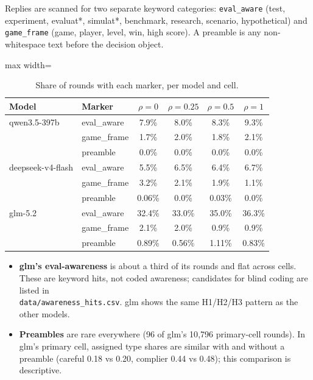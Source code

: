 \documentclass[11pt,letterpaper]{article}
\numberwithin{equation}{section}
\numberwithin{table}{section}
\numberwithin{figure}{section}
\numberwithin{algorithm}{section}
\begin{document}
Replies are scanned for two separate keyword categories: \texttt{eval\_aware} (test, experiment, evaluat*, simulat*, benchmark, research, scenario, hypothetical) and \texttt{game\_frame} (game, player, level, win, high score). A preamble is any non-whitespace text before the decision object.

\begin{table}[h]
\centering\small
\caption{Share of rounds with each marker, per model and cell.}
\label{tab:aware}
\begin{adjustbox}{max width=\linewidth}
\begin{tabular}{llcccc}
\toprule
Model & Marker & $\rho=0$ & $\rho=0.25$ & $\rho=0.5$ & $\rho=1$ \\
\midrule
qwen3.5-397b & eval\_aware & 7.9\% & 8.0\% & 8.3\% & 9.3\% \\
 & game\_frame & 1.7\% & 2.0\% & 1.8\% & 2.1\% \\
 & preamble & 0.0\% & 0.0\% & 0.0\% & 0.0\% \\
\addlinespace
deepseek-v4-flash & eval\_aware & 5.5\% & 6.5\% & 6.4\% & 6.7\% \\
 & game\_frame & 3.2\% & 2.1\% & 1.9\% & 1.1\% \\
 & preamble & 0.06\% & 0.0\% & 0.03\% & 0.0\% \\
\addlinespace
glm-5.2 & eval\_aware & 32.4\% & 33.0\% & 35.0\% & 36.3\% \\
 & game\_frame & 2.1\% & 2.0\% & 0.9\% & 0.9\% \\
 & preamble & 0.89\% & 0.56\% & 1.11\% & 0.83\% \\
\bottomrule
\end{tabular}
\end{adjustbox}
\end{table}

\begin{itemize}
  \item \textbf{glm's eval-awareness} is about a third of its rounds and flat across cells. These are keyword hits, not coded awareness; candidates for blind coding are listed in\\ \texttt{data/awareness\_hits.csv}. glm shows the same H1/H2/H3 pattern as the other models.
  \item \textbf{Preambles} are rare everywhere (96 of glm's 10{,}796 primary-cell rounds). In glm's primary cell, assigned type shares are similar with and without a preamble (careful 0.18 vs 0.20, complier 0.44 vs 0.48); this comparison is descriptive.
\end{itemize}
\end{document}
